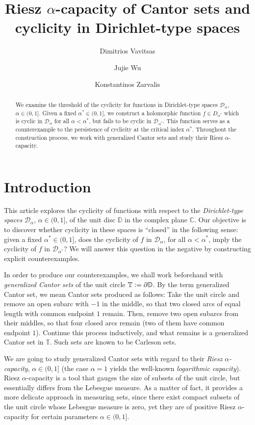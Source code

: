 \documentclass[12pt]{amsart}
\title[Cantor sets and cyclicity]{Riesz $\alpha$-capacity of Cantor sets and cyclicity in Dirichlet-type spaces}
\author[D. Vavitsas]{Dimitrios Vavitsas}
\author[J. Wu]{Jujie Wu}
\author[K. Zarvalis]{Konstantinos Zarvalis}
\theoremstyle{definition}\newtheorem{remark}[theorem]{Remark}
\theoremstyle{definition}\newtheorem{example}[theorem]{Example}
\theoremstyle{definition}\newtheorem{definition}{Definition}
\numberwithin{equation}{section}
\newcommand\CC{{\mathbb C}}
\newcommand\DD{{\mathbb D}}
\newcommand\TT{{\mathbb T}}
\newcommand\DDD{{\mathcal D}}
\begin{document}
\maketitle
\begin{abstract}
We examine the threshold of the cyclicity for functions in Dirichlet-type spaces $\mathcal{D}_\alpha$, $\alpha\in(0,1]$. Given a fixed $\alpha^*\in(0,1]$, we construct a holomorphic function $f\in D_{\alpha^*}$ which is cyclic in $\mathcal{D}_\alpha$ for all $ \alpha<\alpha^*$, but fails to be cyclic in $\mathcal{D}_{\alpha^*}$. This function serves as a counterexample to the persistence of cyclicity at the critical index $\alpha^*$. Throughout the construction process, we work with generalized Cantor sets and study their Riesz $\alpha$-capacity. 
\end{abstract}

\section{Introduction}

This article explores the cyclicity of functions with respect to the \textit{Dirichlet-type spaces} $\mathcal{D}_\alpha$, $\alpha\in(0,1]$, of the unit disc $\DD$ in the complex plane $\CC$. Our objective is to discover whether cyclicity in these spaces is ``closed'' in the following sense: given a fixed $\alpha^* \in (0,1]$, does the cyclicity of $f$ in $\DDD_\alpha$, for all $\alpha < \alpha^*$, imply the cyclicity of $f$ in $\DDD_{\alpha^*}$? We will answer this question in the negative by constructing explicit counterexamples. 

In order to produce our counterexamples, we shall work beforehand with \textit{generalized Cantor sets} of the unit circle $\TT\vcentcolon=\partial\DD$. By the term generalized Cantor set, we mean Cantor sets produced as follows: Take the unit circle and remove an open subarc with $-1$ in the middle, so that two closed arcs of equal length with common endpoint $1$ remain. Then, remove two open subarcs from their middles, so that four closed arcs remain (two of them have common endpoint $1$). Continue this process inductively, and what remains is a generalized Cantor set in $\TT$. Such sets are known to be Carleson sets. 

We are going to study generalized Cantor sets with regard to their \textit{Riesz} $\alpha$\textit{-capacity}, $\alpha\in(0,1]$ (the case $\alpha=1$ yields the well-known \textit{logarithmic capacity}). Riesz $\alpha$-capacity is a tool that gauges the size of subsets of the unit circle, but essentially differs from the Lebesgue measure. As a matter of fact, it provides a more delicate approach in measuring sets, since there exist compact subsets of the unit circle whose Lebesgue measure is zero, yet they are of positive Riesz $\alpha$-capacity for certain parameters $\alpha\in(0,1]$.  
\end{document}
